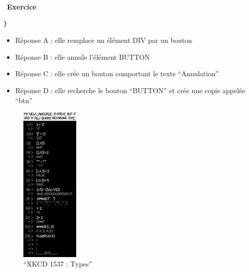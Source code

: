 \documentclass[
  11pt,
]{article}
\providecommand{\tightlist}{%
  \setlength{\itemsep}{0pt}\setlength{\parskip}{0pt}}
\newcounter{exo}
\newenvironment{exercice}[1]
{\par \medskip   \addtocounter{exo}{1} \noindent  
\begin{bclogo}[arrondi =0.1,   noborder = true, logo=\bccrayon, marge=4]{~\textbf{Exercice} \textbf{\theexo} {\itshape #1} }  \par}
{
\end{bclogo}
 \par \bigskip }
\begin{document}
\begin{exercice}{}
\begin{enumerate}
\begin{lstlisting}
}
\end{lstlisting}

  \begin{itemize}
  \tightlist
  \item
    Réponse A : elle remplace un élément DIV par un bouton
  \item
    Réponse B : elle annule l'élément BUTTON
  \item
    Réponse C : elle crée un bouton comportant le texte ``Annulation''
  \item
    Réponse D : elle recherche le bouton ``BUTTON'' et crée une copie
    appelée ``btn''
  \end{itemize}
\end{enumerate}

\end{exercice}

\begin{figure}
\centering
\includegraphics[width=0.25\textwidth,height=\textheight]{images/types.png}
\caption{``XKCD 1537 : Types''}
\end{figure}
\end{document}
